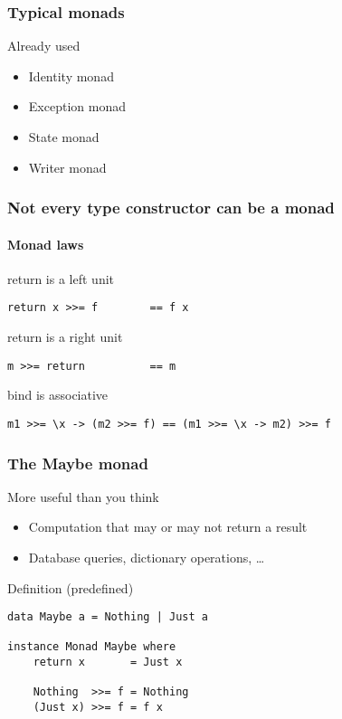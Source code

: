\documentclass{beamer}
\begin{document}
\begin{frame}[fragile]
  \frametitle{Typical monads}
  \begin{block}{Already used}
  \begin{itemize}       
  \item Identity monad
  \item Exception monad
  \item State monad
  \item Writer monad
  \end{itemize} 
  \end{block}   
\end{frame}

\begin{frame}[fragile]
  \frametitle{Not every type constructor can be a monad}
  \framesubtitle{Monad laws}
  \begin{alertblock}{return is a left unit}
\begin{lstlisting}
return x >>= f        == f x
\end{lstlisting}
  \end{alertblock}
  \begin{alertblock}{return is a right unit}
\begin{lstlisting}
m >>= return          == m
\end{lstlisting}
  \end{alertblock}
  \begin{alertblock}{bind is associative}
\begin{lstlisting}
m1 >>= \x -> (m2 >>= f) == (m1 >>= \x -> m2) >>= f
\end{lstlisting}
  \end{alertblock}
\end{frame}

\begin{frame}[fragile]
  \frametitle{The Maybe monad}
  \begin{block}{More useful than you think}
                \begin{itemize}         
                        \item Computation that may or may not return a result
                        \item Database queries, dictionary operations, \dots
                \end{itemize}   
                \end{block}     
\pause
\begin{block}{Definition (predefined)}
\begin{lstlisting}
data Maybe a = Nothing | Just a

instance Monad Maybe where
    return x       = Just x
    
    Nothing  >>= f = Nothing
    (Just x) >>= f = f x
\end{lstlisting}  
\end{block}
\end{frame}             
\end{document}
